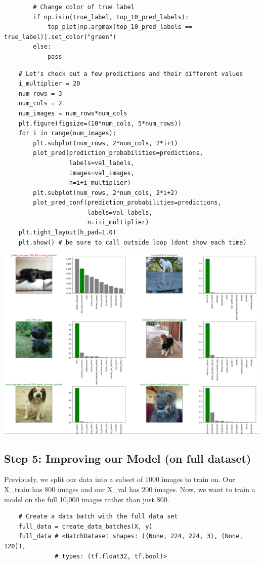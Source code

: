 \documentclass[11pt, a4paper]{article}
\begin{document}
\begin{spacing}{1.1}
\begin{lstlisting}
		# Change color of true label
		if np.isin(true_label, top_10_pred_labels):
			top_plot[np.argmax(top_10_pred_labels == true_label)].set_color("green")
		else:
			pass \end{lstlisting} \newpage
	
	\begin{lstlisting}
	# Let's check out a few predictions and their different values
	i_multiplier = 20
	num_rows = 3
	num_cols = 2
	num_images = num_rows*num_cols
	plt.figure(figsize=(10*num_cols, 5*num_rows))
	for i in range(num_images):
		plt.subplot(num_rows, 2*num_cols, 2*i+1)
		plot_pred(prediction_probabilities=predictions,
		          labels=val_labels,
		          images=val_images,
		          n=i+i_multiplier)
		plt.subplot(num_rows, 2*num_cols, 2*i+2)
		plot_pred_conf(prediction_probabilities=predictions,
		               labels=val_labels,
		               n=i+i_multiplier)
	plt.tight_layout(h_pad=1.0)
	plt.show() # be sure to call outside loop (dont show each time)	\end{lstlisting} \vspace*{1mm}
	\includegraphics[scale=.62]{dog_plot} \vspace*{1mm} \\
	\subsection{Step 5: Improving our Model (on full dataset)}
	Previously, we split our data into a subset of 1000 images to train on. Our X\_train has 800 images and our X\_val has 200 images. Now, we want to train a model on the full 10,000 images rather than just 800.
	\begin{lstlisting}
	# Create a data batch with the full data set
	full_data = create_data_batches(X, y)
	full_data # <BatchDataset shapes: ((None, 224, 224, 3), (None, 120)), 
	          # types: (tf.float32, tf.bool)>  \end{lstlisting} \newpage
	

\end{spacing}
\end{document}
